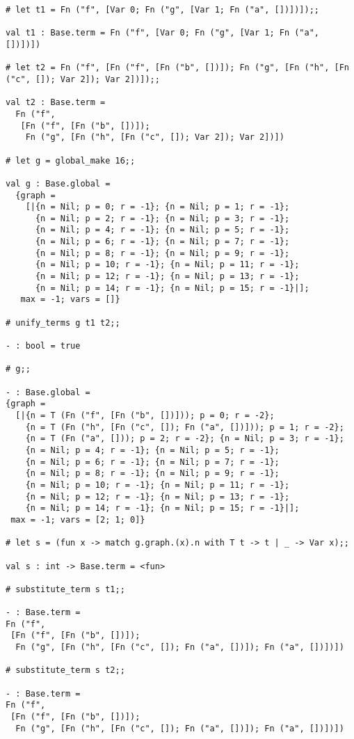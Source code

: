 \documentclass[a4paper]{article}
\begin{document}
\begin{lstlisting}
# let t1 = Fn ("f", [Var 0; Fn ("g", [Var 1; Fn ("a", [])])]);;

val t1 : Base.term = Fn ("f", [Var 0; Fn ("g", [Var 1; Fn ("a", [])])])

# let t2 = Fn ("f", [Fn ("f", [Fn ("b", [])]); Fn ("g", [Fn ("h", [Fn ("c", []); Var 2]); Var 2])]);;

val t2 : Base.term =
  Fn ("f",
   [Fn ("f", [Fn ("b", [])]);
    Fn ("g", [Fn ("h", [Fn ("c", []); Var 2]); Var 2])])

# let g = global_make 16;;

val g : Base.global =
  {graph =
    [|{n = Nil; p = 0; r = -1}; {n = Nil; p = 1; r = -1};
      {n = Nil; p = 2; r = -1}; {n = Nil; p = 3; r = -1};
      {n = Nil; p = 4; r = -1}; {n = Nil; p = 5; r = -1};
      {n = Nil; p = 6; r = -1}; {n = Nil; p = 7; r = -1};
      {n = Nil; p = 8; r = -1}; {n = Nil; p = 9; r = -1};
      {n = Nil; p = 10; r = -1}; {n = Nil; p = 11; r = -1};
      {n = Nil; p = 12; r = -1}; {n = Nil; p = 13; r = -1};
      {n = Nil; p = 14; r = -1}; {n = Nil; p = 15; r = -1}|];
   max = -1; vars = []}

# unify_terms g t1 t2;;

- : bool = true

# g;;

- : Base.global =
{graph =
  [|{n = T (Fn ("f", [Fn ("b", [])])); p = 0; r = -2};
    {n = T (Fn ("h", [Fn ("c", []); Fn ("a", [])])); p = 1; r = -2};
    {n = T (Fn ("a", [])); p = 2; r = -2}; {n = Nil; p = 3; r = -1};
    {n = Nil; p = 4; r = -1}; {n = Nil; p = 5; r = -1};
    {n = Nil; p = 6; r = -1}; {n = Nil; p = 7; r = -1};
    {n = Nil; p = 8; r = -1}; {n = Nil; p = 9; r = -1};
    {n = Nil; p = 10; r = -1}; {n = Nil; p = 11; r = -1};
    {n = Nil; p = 12; r = -1}; {n = Nil; p = 13; r = -1};
    {n = Nil; p = 14; r = -1}; {n = Nil; p = 15; r = -1}|];
 max = -1; vars = [2; 1; 0]}

# let s = (fun x -> match g.graph.(x).n with T t -> t | _ -> Var x);;

val s : int -> Base.term = <fun>

# substitute_term s t1;;

- : Base.term =
Fn ("f",
 [Fn ("f", [Fn ("b", [])]);
  Fn ("g", [Fn ("h", [Fn ("c", []); Fn ("a", [])]); Fn ("a", [])])])

# substitute_term s t2;;

- : Base.term =
Fn ("f",
 [Fn ("f", [Fn ("b", [])]);
  Fn ("g", [Fn ("h", [Fn ("c", []); Fn ("a", [])]); Fn ("a", [])])])
\end{lstlisting}
\end{document}
